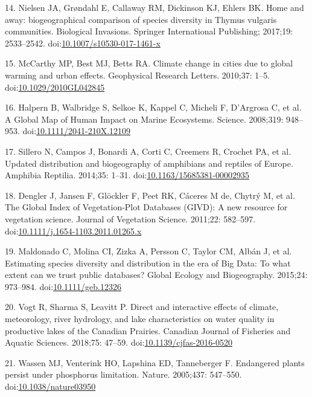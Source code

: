 \documentclass[10pt,letterpaper]{article}
\begin{document}
\hypertarget{ref-Nielsen2017}{}
14. Nielsen JA, Grøndahl E, Callaway RM, Dickinson KJ, Ehlers BK. Home
and away: biogeographical comparison of species diversity in Thymus
vulgaris communities. Biological Invasions. Springer International
Publishing; 2017;19: 2533--2542.
doi:\href{https://doi.org/10.1007/s10530-017-1461-x}{10.1007/s10530-017-1461-x}

\hypertarget{ref-McCarthy2010}{}
15. McCarthy MP, Best MJ, Betts RA. Climate change in cities due to
global warming and urban effects. Geophysical Research Letters. 2010;37:
1--5.
doi:\href{https://doi.org/10.1029/2010GL042845}{10.1029/2010GL042845}

\hypertarget{ref-Halpern2008}{}
16. Halpern B, Walbridge S, Selkoe K, Kappel C, Micheli F, D'Argrosa C,
et al. A Global Map of Human Impact on Marine Ecosystems. Science.
2008;319: 948--953.
doi:\href{https://doi.org/10.1111/2041-210X.12109}{10.1111/2041-210X.12109}

\hypertarget{ref-Sillero2014}{}
17. Sillero N, Campos J, Bonardi A, Corti C, Creemers R, Crochet PA, et
al. Updated distribution and biogeography of amphibians and reptiles of
Europe. Amphibia Reptilia. 2014;35: 1--31.
doi:\href{https://doi.org/10.1163/15685381-00002935}{10.1163/15685381-00002935}

\hypertarget{ref-Dengler2011}{}
18. Dengler J, Jansen F, Glöckler F, Peet RK, Cáceres M de, Chytrý M, et
al. The Global Index of Vegetation-Plot Databases (GIVD): A new resource
for vegetation science. Journal of Vegetation Science. 2011;22:
582--597.
doi:\href{https://doi.org/10.1111/j.1654-1103.2011.01265.x}{10.1111/j.1654-1103.2011.01265.x}

\hypertarget{ref-Maldonado2015}{}
19. Maldonado C, Molina CI, Zizka A, Persson C, Taylor CM, Albán J, et
al. Estimating species diversity and distribution in the era of Big
Data: To what extent can we trust public databases? Global Ecology and
Biogeography. 2015;24: 973--984.
doi:\href{https://doi.org/10.1111/geb.12326}{10.1111/geb.12326}

\hypertarget{ref-Vogt2018}{}
20. Vogt R, Sharma S, Leavitt P. Direct and interactive effects of
climate, meteorology, river hydrology, and lake characteristics on water
quality in productive lakes of the Canadian Prairies. Canadian Journal
of Fisheries and Aquatic Sciences. 2018;75: 47--59.
doi:\href{https://doi.org/10.1139/cjfas-2016-0520}{10.1139/cjfas-2016-0520}

\hypertarget{ref-Wassen2005}{}
21. Wassen MJ, Venterink HO, Lapshina ED, Tanneberger F. Endangered
plants persist under phosphorus limitation. Nature. 2005;437: 547--550.
doi:\href{https://doi.org/10.1038/nature03950}{10.1038/nature03950}
\end{document}
